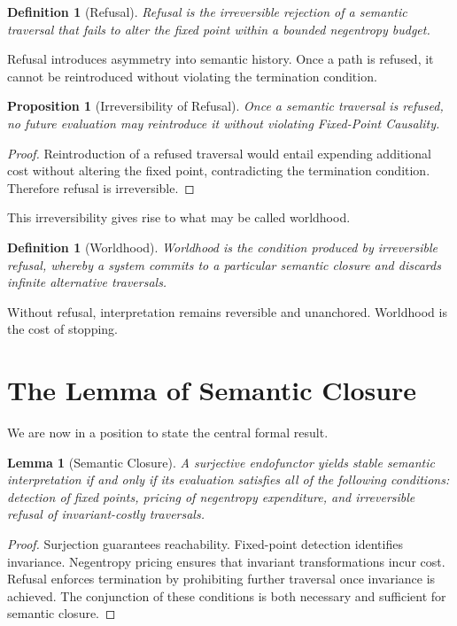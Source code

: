 \documentclass[12pt]{article}
\newtheorem{lemma}[theorem]{Lemma}
\newtheorem{definition}[theorem]{Definition}
\newtheorem{proposition}[theorem]{Proposition}
\theoremstyle{remark}
\begin{document}
\begin{definition}[Refusal]
Refusal is the irreversible rejection of a semantic traversal that fails to alter the fixed point within a bounded negentropy budget.
\end{definition}

Refusal introduces asymmetry into semantic history. Once a path is refused, it cannot be reintroduced without violating the termination condition.

\begin{proposition}[Irreversibility of Refusal]
Once a semantic traversal is refused, no future evaluation may reintroduce it without violating Fixed-Point Causality.
\end{proposition}

\begin{proof}
Reintroduction of a refused traversal would entail expending additional cost without altering the fixed point, contradicting the termination condition. Therefore refusal is irreversible.
\end{proof}

This irreversibility gives rise to what may be called worldhood.

\begin{definition}[Worldhood]
Worldhood is the condition produced by irreversible refusal, whereby a system commits to a particular semantic closure and discards infinite alternative traversals.
\end{definition}

Without refusal, interpretation remains reversible and unanchored. Worldhood is the cost of stopping.

\section{The Lemma of Semantic Closure}

We are now in a position to state the central formal result.

\begin{lemma}[Semantic Closure]
\label{lem:semantic_closure}
A surjective endofunctor yields stable semantic interpretation if and only if its evaluation satisfies all of the following conditions: detection of fixed points, pricing of negentropy expenditure, and irreversible refusal of invariant-costly traversals.
\end{lemma}

\begin{proof}
Surjection guarantees reachability. Fixed-point detection identifies invariance. Negentropy pricing ensures that invariant transformations incur cost. Refusal enforces termination by prohibiting further traversal once invariance is achieved. The conjunction of these conditions is both necessary and sufficient for semantic closure.
\end{proof}
\end{document}
